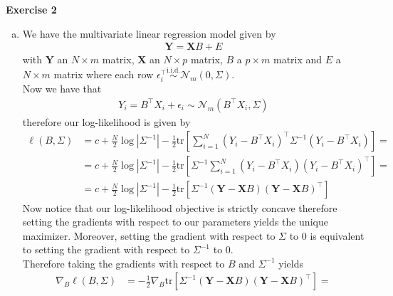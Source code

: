 \documentclass[10pt,notitlepage]{article}
\newcommand{\MBlue}[1]{{\color{MBlue}#1}}
\newcommand{\abs}[1]{\left\vert#1\right\vert}
\newcommand{\Xv}{\mathbf{X}}
\newcommand{\Yv}{\mathbf{Y}}
\newcommand{\tr}[1]{\text{tr}\left[#1\right]}
\begin{document}
    \newpage
    \textbf{\large \MBlue{Exercise 2}}
    \vskip10pt
    \noindent
	\begin{exercise}[Solution]
        \begin{enumerate}[(a)]
            \item We have the multivariate linear regression model given by
                    \begin{align*}
                        \Yv = \Xv B + E
                    \end{align*}
                    with $\Yv$ an $N\times m$ matrix, $\Xv$ an $N\times p$ matrix, $B$ a $p\times m$ matrix and $E$ a $N\times m$ matrix where each row $\epsilon_i^\top\overset{\text{i.i.d.}}{\sim}\mathcal{N}_m\left(0,\Sigma\right)$.\\
                    Now we have that
                    \begin{align*}
                        Y_i = B^\top X_i + \epsilon_i \sim \mathcal{N}_m\left(B^\top X_i, \Sigma\right)
                    \end{align*}
                    therefore our log-likelihood is given by
                    \begin{align*}
                        \ell\left(B,\Sigma\right) &= c + \frac{N}{2}\log\abs{\Sigma^{-1}} - \frac{1}{2}\tr{\sum_{i=1}^{N}\left(Y_i-B^\top X_i\right)^\top \Sigma^{-1}\left(Y_i-B^\top X_i\right)} = \\
                        &= c + \frac{N}{2}\log\abs{\Sigma^{-1}} - \frac{1}{2}\tr{\Sigma^{-1}\sum_{i=1}^{N}\left(Y_i-B^\top X_i\right)\left(Y_i-B^\top X_i\right)^\top} = \\
                        &= c + \frac{N}{2}\log\abs{\Sigma^{-1}} - \frac{1}{2}\tr{\Sigma^{-1} \left(\Yv-\Xv B\right)\left(\Yv-\Xv B\right)^\top}
                    \end{align*}
                    Now notice that our log-likelihood objective is strictly concave therefore setting the gradients with respect to our parameters yields the unique maximizer. Moreover, setting the gradient with respect to $\Sigma$ to 0 is equivalent to setting the gradient with respect to $\Sigma^{-1}$ to 0.\\
                    Therefore taking the gradients with respect to $B$ and $\Sigma^{-1}$ yields
                    \begin{align*}
                        \nabla_B \ell\left(B,\Sigma\right) &= -\frac{1}{2}\nabla_B \tr{\Sigma^{-1} \left(\Yv-\Xv B\right)\left(\Yv-\Xv B\right)^\top} = \\

\end{align*}
\end{enumerate}
\end{exercise}
\end{document}
